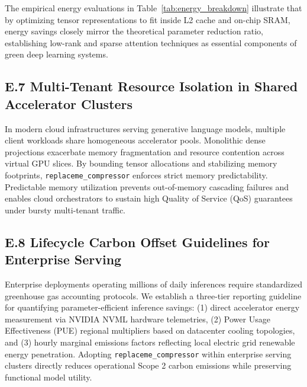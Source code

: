 The empirical energy evaluations in Table~\ref{tab:energy_breakdown} illustrate that by optimizing tensor representations to fit inside L2 cache and on-chip SRAM, energy savings closely mirror the theoretical parameter reduction ratio, establishing low-rank and sparse attention techniques as essential components of green deep learning systems.

\subsection*{E.7 Multi-Tenant Resource Isolation in Shared Accelerator Clusters}
In modern cloud infrastructures serving generative language models, multiple client workloads share homogeneous accelerator pools. Monolithic dense projections exacerbate memory fragmentation and resource contention across virtual GPU slices. By bounding tensor allocations and stabilizing memory footprints, \texttt{replaceme\_compressor} enforces strict memory predictability. Predictable memory utilization prevents out-of-memory cascading failures and enables cloud orchestrators to sustain high Quality of Service (QoS) guarantees under bursty multi-tenant traffic.

\subsection*{E.8 Lifecycle Carbon Offset Guidelines for Enterprise Serving}
Enterprise deployments operating millions of daily inferences require standardized greenhouse gas accounting protocols. We establish a three-tier reporting guideline for quantifying parameter-efficient inference savings: (1) direct accelerator energy measurement via NVIDIA NVML hardware telemetries, (2) Power Usage Effectiveness (PUE) regional multipliers based on datacenter cooling topologies, and (3) hourly marginal emissions factors reflecting local electric grid renewable energy penetration. Adopting \texttt{replaceme\_compressor} within enterprise serving clusters directly reduces operational Scope 2 carbon emissions while preserving functional model utility.
